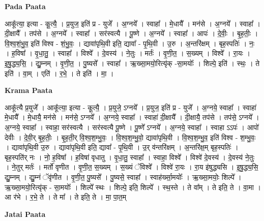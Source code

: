 \documentclass[17pt]{extarticle}
\begin{document}
\textbf{Pada Paata} \newline

आकू᳚त्या॒ इत्या - कू॒त्यै॒ । प्र॒युज॒ इति॑ प्र - युजे᳚ । अ॒ग्नये᳚ । स्वाहा᳚ । मे॒धायै᳚ । मन॑से । अ॒ग्नये᳚ । स्वाहा᳚ । दी॒क्षायै᳚ । तप॑से । अ॒ग्नये᳚ । स्वाहा᳚ । सर॑स्वत्यै । पू॒ष्णे । अ॒ग्नये᳚ । स्वाहा᳚ । आपः॑ । दे॒वीः॒ । बृ॒ह॒तीः॒ । वि॒श्व॒शं॒भु॒व॒ इति॑ विश्व - शं॒भु॒वः॒ । द्यावा॑पृथि॒वी इति॒ द्यावा᳚ - पृ॒थि॒वी । उ॒रु । अ॒न्तरि॑क्षम् । बृह॒स्पतिः॑ । नः॒ । ह॒विषा᳚ । वृ॒धा॒तु॒ । स्वाहा᳚ । विश्वे᳚ । दे॒वस्य॑ । ने॒तुः । मर्तः॑ । वृ॒णी॒त॒ । स॒ख्यम् । विश्वे᳚ । रा॒यः । इ॒षु॒द्ध्य॒सि॒ । द्यु॒म्नम् । वृ॒णी॒त॒ । पु॒ष्यसे᳚ । स्वाहा᳚ । ऋ॒ख्सा॒मयो॒रित्यृ॑क् -सा॒मयोः᳚ । शिल्पे॒ इति॑ । स्थः॒ । ते इति॑ । वा॒म् । एति॑ । र॒भे॒ । ते इति॑ । मा॒ ।  \newline


\textbf{Krama Paata} \newline

आकू᳚त्यै प्र॒युजे᳚ । आकू᳚त्या॒ इत्या - कू॒त्यै॒ । प्र॒युजे॒ ऽग्नये᳚ । 
प्र॒युज॒ इति॑ प्र - युजे᳚ । अ॒ग्नये॒ स्वाहा᳚ । स्वाहा॑ मे॒धायै᳚ । मे॒धायै॒ मन॑से । मन॑से॒ ऽग्नये᳚ । अ॒ग्नये॒ स्वाहा᳚ । स्वाहा॑ दी॒क्षायै᳚ । दी॒क्षायै॒ तप॑से । तप॑से॒ ऽग्नये᳚ । अ॒ग्नये॒ स्वाहा᳚ । स्वाहा॒ सर॑स्वत्यै । सर॑स्वत्यै पू॒ष्णे । पू॒ष्णे᳚ ऽग्नये᳚ । 
अ॒ग्नये॒ स्वाहा᳚ । स्वाहा ऽऽपः॑ । आपो॑ देवीः । दे॒वी॒र् बृ॒ह॒तीः॒ । बृ॒ह॒ती॒र् वि॒श्व॒श॒म्भु॒वः॒ । वि॒श्व॒श॒म्भु॒वो॒ द्यावा॑पृथि॒वी । वि॒श्व॒श॒म्भु॒व॒ इति॑ विश्व - श॒म्भु॒वः॒ । द्यावा॑पृथि॒वी उ॒रु । द्यावा॑पृथि॒वी इति॒ द्यावा᳚ - पृ॒थि॒वी । उ॒र् व॑न्तरि॑क्षम् । अ॒न्तरि॑क्ष॒म् बृह॒स्पतिः॑ । बृह॒स्पति॑र् नः । नो॒ ह॒विषा᳚ । ह॒विषा॑ वृधातु । वृ॒धा॒तु॒ स्वाहा᳚ । स्वाहा॒ विश्वे᳚ । विश्वे॑ दे॒वस्य॑ । दे॒वस्य॑ ने॒तुः । ने॒तुर् मर्तः॑ । मर्तो॑ वृणीत । वृ॒णी॒त॒ स॒ख्यम् । स॒ख्यं ॅविश्वे᳚ । विश्वे॑ रा॒यः । रा॒य इ॑षुद्ध्यसि । इ॒षु॒द्ध्य॒सि॒ द्यु॒म्नम् । द्यु॒म्नं ॅवृ॑णीत । वृ॒णी॒त॒ पु॒ष्यसे᳚ । पु॒ष्यसे॒ स्वाहा᳚ । स्वाह॑र्ख्सा॒मयोः᳚ । ऋ॒ख्सा॒मयोः॒ शिल्पे᳚ । ऋ॒ख्सा॒मयो॒रित्यृ॑क् - सा॒मयोः᳚ । शिल्पे᳚ स्थः । शिल्पे॒ इति॒ शिल्पे᳚ । स्थ॒स्ते । ते वा᳚म् । ते इति॒ ते । वा॒मा । आ र॑भे । र॒भे॒ ते । ते मा᳚ । ते इति॒ ते । मा॒ पा॒त॒म् \newline

\textbf{Jatai Paata} \newline
\end{document}
